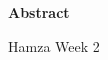 \begin{center}        
    \Large
    \textbf{Abstract}\\
\end{center}

Hamza Week 2

\afterpage{\blankpage}